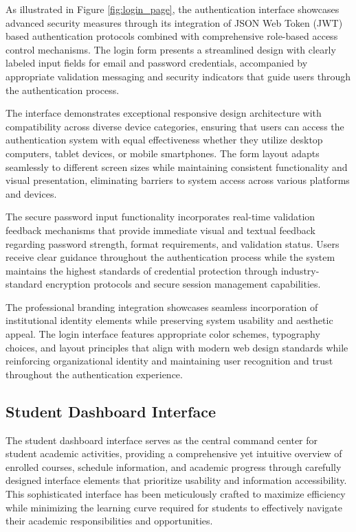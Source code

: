 As illustrated in Figure \ref{fig:login_page}, the authentication interface showcases advanced security measures through its integration of JSON Web Token (JWT) based authentication protocols combined with comprehensive role-based access control mechanisms. The login form presents a streamlined design with clearly labeled input fields for email and password credentials, accompanied by appropriate validation messaging and security indicators that guide users through the authentication process.

The interface demonstrates exceptional responsive design architecture with compatibility across diverse device categories, ensuring that users can access the authentication system with equal effectiveness whether they utilize desktop computers, tablet devices, or mobile smartphones. The form layout adapts seamlessly to different screen sizes while maintaining consistent functionality and visual presentation, eliminating barriers to system access across various platforms and devices.

The secure password input functionality incorporates real-time validation feedback mechanisms that provide immediate visual and textual feedback regarding password strength, format requirements, and validation status. Users receive clear guidance throughout the authentication process while the system maintains the highest standards of credential protection through industry-standard encryption protocols and secure session management capabilities.

The professional branding integration showcases seamless incorporation of institutional identity elements while preserving system usability and aesthetic appeal. The login interface features appropriate color schemes, typography choices, and layout principles that align with modern web design standards while reinforcing organizational identity and maintaining user recognition and trust throughout the authentication experience.

\subsection{Student Dashboard Interface}

The student dashboard interface serves as the central command center for student academic activities, providing a comprehensive yet intuitive overview of enrolled courses, schedule information, and academic progress through carefully designed interface elements that prioritize usability and information accessibility. This sophisticated interface has been meticulously crafted to maximize efficiency while minimizing the learning curve required for students to effectively navigate their academic responsibilities and opportunities.

